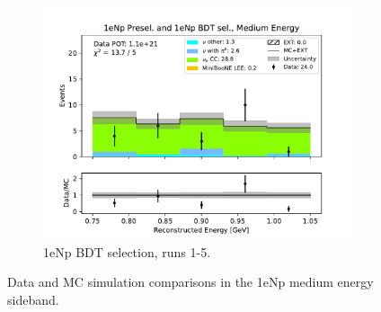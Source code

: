 \begin{figure}[H]
\begin{subfigure}{0.33\linewidth}
        \includegraphics[width=\linewidth]{technote/Sidebands/Figures/NearSideband/near_sideband_reco_e_run1234b4c4d5_NP_NPBDT_MEDIUM_ENERGY.pdf}
        \caption{1eNp BDT selection, runs 1-5.}
    \end{subfigure}
    \caption{Data and MC simulation comparisons in the 1eNp medium energy sideband.}
\end{figure}

